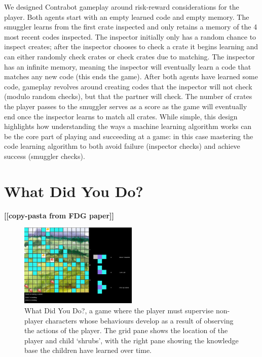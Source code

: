 \documentclass{sig-alternate}
\newcommand{\todo}[1]{\textbf{[[#1]]}}
\begin{document}
We designed {\sc Contrabot} gameplay around risk-reward considerations for the player.
Both agents start with an empty learned code and empty memory. 
The smuggler learns from the first crate inspected and only retains a memory of the 4 most recent codes inspected. 
The inspector initially only has a random chance to inspect creates; after the inspector chooses to check a crate it begins learning and can either randomly check crates or check crates due to matching.
The inspector has an infinite memory, meaning the inspector will eventually learn a code that matches any new code (this ends the game).
After both agents have learned some code, gameplay revolves around creating codes that the inspector will not check (modulo random checks), but that the partner will check.
The number of crates the player passes to the smuggler serves as a score as the game will eventually end once the inspector learns to match all crates.
While simple, this design highlights how understanding the ways a machine learning algorithm works can be the core part of playing and succeeding at a game: in this case mastering the code learning algorithm to both avoid failure (inspector checks) and achieve success (smuggler checks).


\section{What Did You Do?}
\todo{copy-pasta from FDG paper}

\begin{figure}[tb]
\centering
\includegraphics[width=0.5\textwidth]{images/WDYD}
\caption{{\sc What Did You Do?}, a game where the player must supervise non-player characters whose behaviours develop as a result of observing the actions of the player.  The grid pane shows the location of the player and child `shrubs', with the right pane showing the knowledge base the children have learned over time.}
\label{fig:WDYD}
\end{figure}
\end{document}
